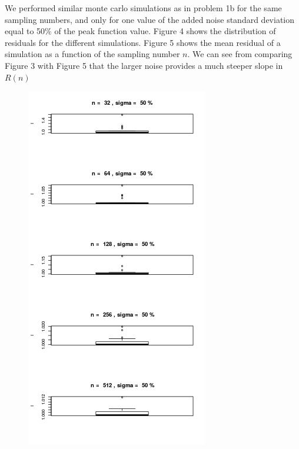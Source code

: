 \documentclass[11pt]{article}
\begin{document}
\clearpage

\begin{homeworkProblem}
    
    We performed similar monte carlo simulations as in problem 1b for the same
    sampling numbers, and only for one value of the added noise standard
    deviation equal to 50\% of the peak function value. Figure 4 shows the
    distribution of residuals for the different simulations. Figure 5 shows the
    mean residual of a simulation as a function of the sampling number $n$. We
    can see from comparing Figure 3 with Figure 5 that the larger noise
    provides a much steeper slope in $R(n)$

        \begin{figure}[!ht]
            \begin{centering}
                \includegraphics[scale=1]{hw8_2_Rdist.png}


\end{centering}
\end{figure}
\end{homeworkProblem}
\end{document}
